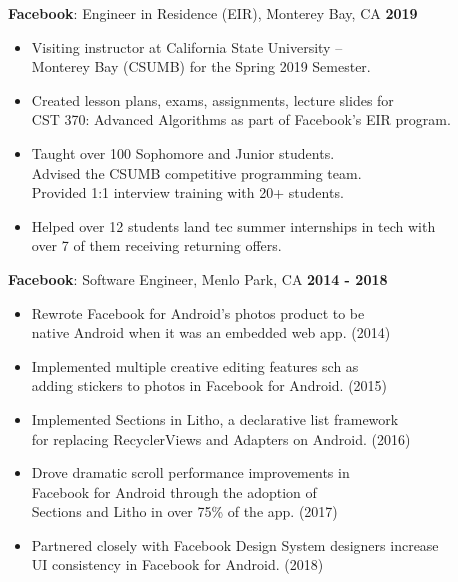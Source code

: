 \documentclass[sectioned]{dsyangres}
\begin{document}
\begin{resume}
\textbf{Facebook}: Engineer in Residence (EIR), Monterey Bay, CA \hfill \textbf{2019}
  \begin{itemize}
      \item Visiting instructor at California State University --
         \\ Monterey Bay (CSUMB) for the Spring 2019 Semester.
      \item Created lesson plans, exams, assignments, lecture slides for
         \\ CST 370: Advanced Algorithms as part of Facebook's EIR program.
      \item Taught over 100 Sophomore and Junior students.
         \\ Advised the CSUMB competitive programming team.
         \\ Provided 1:1 interview training with 20+ students.
      \item Helped over 12 students land tec summer internships in tech with
         \\ over 7 of them receiving returning offers.
  \end{itemize}

\textbf{Facebook}: Software Engineer, Menlo Park, CA \hfill \textbf{2014 - 2018}
  \begin{itemize}
      \item Rewrote Facebook for Android's photos product to be 
         \\ native Android when it was an embedded web app. (2014)
      \item Implemented multiple creative editing features sch as
         \\ adding stickers to photos in Facebook for Android. (2015)
      \item Implemented Sections in Litho, a declarative list framework
         \\ for replacing RecyclerViews and Adapters on Android. (2016)
      \item Drove dramatic scroll performance improvements in 
         \\ Facebook for Android through the adoption of 
         \\ Sections and Litho in over 75\% of the app. (2017)
      \item Partnered closely with Facebook Design System designers increase 
         \\ UI consistency in Facebook for Android. (2018)
  \end{itemize}
%


\end{resume}
\end{document}
